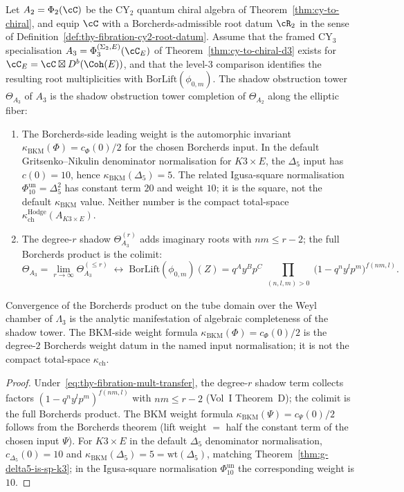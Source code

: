 \begin{theorem}
\label{thm:thy-fibration-borcherds-shadow}
Let $A_2 = \Phi_2(\cC)$ be the CY$_2$ quantum chiral algebra of
Theorem~\ref{thm:cy-to-chiral}, and equip $\cC$ with a
Borcherds-admissible root datum $\cR_2$ in the sense of
Definition~\ref{def:thy-fibration-cy2-root-datum}.  Assume that the
framed CY$_3$ specialisation
$A_3=\Phi_3^{(\Sigma_2,E)}(\cC_E)$ of
Theorem~\ref{thm:cy-to-chiral-d3} exists for
$\cC_E=\cC\boxtimes D^b(\Coh(E))$, and that the level-$3$ comparison
identifies the resulting root multiplicities with
$\mathrm{BorLift}(\phi_{0,m})$.  The shadow obstruction tower
$\Theta_{A_3}$ of $A_3$ is the shadow obstruction tower completion of
$\Theta_{A_2}$ along the elliptic fiber:
\begin{enumerate}[label=\textup{(D\arabic*)}]
\item The Borcherds-side leading weight is the automorphic invariant
$\kappa_{\mathrm{BKM}}(\Phi)=c_\Phi(0)/2$ for the chosen Borcherds input. In the
default Gritsenko--Nikulin denominator normalisation for
$K3\times E$, the $\Delta_5$ input has $c(0)=10$, hence
$\kappa_{\mathrm{BKM}}(\Delta_5)=5$. The related Igusa-square
normalisation $\Phi_{10}^{\mathrm{un}}=\Delta_5^2$ has constant term $20$ and weight
$10$; it is the square, not the default $\kappa_{\mathrm{BKM}}$ value.
Neither number is the compact total-space
$\kappa_{\mathrm{ch}}^{\mathrm{Hodge}}(A_{K3\times E})$.
\item The degree-$r$ shadow $\Theta^{(r)}_{A_3}$ adds imaginary roots with $nm \leq r-2$; the full Borcherds product is the colimit:
\[
 \Theta_{A_3} = \lim_{r\to\infty}\Theta^{(\leq r)}_{A_3}
 \;\longleftrightarrow\;
 \mathrm{BorLift}(\phi_{0,m})(Z)
 = q^A y^B p^C \prod_{\substack{(n,l,m)>0}} \bigl(1-q^n y^l p^m\bigr)^{f(nm,l)}.
\]
\end{enumerate}
Convergence of the Borcherds product on the tube domain over the Weyl chamber of $\Lambda_3$ is the analytic manifestation of algebraic completeness of the shadow tower. The BKM-side weight formula $\kappa_{\mathrm{BKM}}(\Phi)=c_\Phi(0)/2$ is the degree-$2$ Borcherds weight datum in the named input normalisation; it is not the compact total-space $\kappa_{\mathrm{ch}}$.
\end{theorem}

\begin{proof}
Under~\eqref{eq:thy-fibration-mult-transfer}, the degree-$r$ shadow term collects factors $(1-q^n y^l p^m)^{f(nm,l)}$ with $nm \leq r-2$ (Vol~I Theorem~D); the colimit is the full Borcherds product. The BKM weight formula $\kappa_{\mathrm{BKM}}(\Psi) = c_\Psi(0)/2$ follows from the Borcherds theorem (lift weight $=$ half the constant term of the chosen input $\Psi$). For $K3 \times E$ in the default $\Delta_5$ denominator normalisation, $c_{\Delta_5}(0)=10$ and $\kappa_{\mathrm{BKM}}(\Delta_5) = 5 = \mathrm{wt}(\Delta_5)$, matching Theorem~\ref{thm:g-delta5-is-sp-k3}; in the Igusa-square normalisation $\Phi_{10}^{\mathrm{un}}$ the corresponding weight is $10$.
\end{proof}

